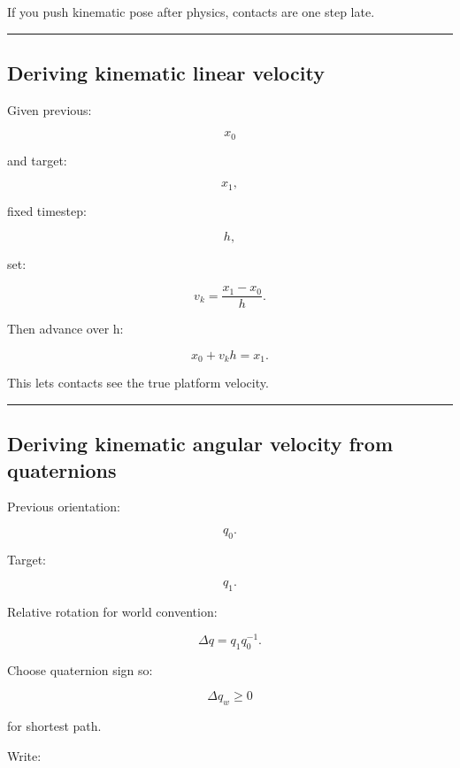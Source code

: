 If you push kinematic pose after physics, contacts are one step late.

\begin{center}\rule{0.5\linewidth}{0.5pt}\end{center}

\subsection{Deriving kinematic linear velocity}\label{06-engine-ii-ch037-deriving-kinematic-linear-velocity}

\hypertarget{06-engine-ii-ch037-deriving-kinematic-linear-velocity}{}

Given previous:

\[
x_0
\]

and target:

\[
x_1,
\]

fixed timestep:

\[
h,
\]

set:

\[
\boxed{
v_k
=
\frac{x_1-x_0}{h}.
}
\]

Then advance over h:

\[
x_0+v_kh=x_1.
\]

This lets contacts see the true platform velocity.

\begin{center}\rule{0.5\linewidth}{0.5pt}\end{center}

\subsection{Deriving kinematic angular velocity from quaternions}\label{06-engine-ii-ch037-deriving-kinematic-angular-velocity-from-quaternions}

\hypertarget{06-engine-ii-ch037-deriving-kinematic-angular-velocity-from-quaternions}{}

Previous orientation:

\[
q_0.
\]

Target:

\[
q_1.
\]

Relative rotation for world convention:

\[
\Delta q
=
q_1q_0^{-1}.
\]

Choose quaternion sign so:

\[
\Delta q_w\ge0
\]

for shortest path.

Write:

